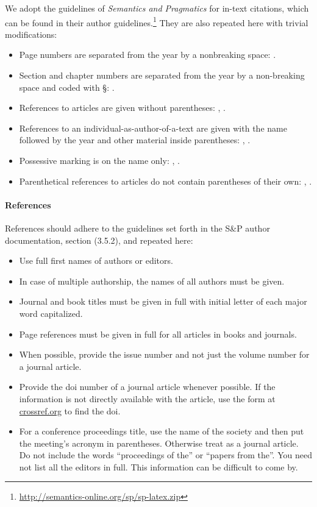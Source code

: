 \documentclass{salt}
\begin{document}
We adopt the guidelines of \emph{Semantics and Pragmatics} for in-text citations, which can be found in their author guidelines.\footnote{\url{http://semantics-online.org/sp/sp-latex.zip}}  They are also repeated here with trivial modifications:
\begin{itemize}
\item Page numbers are separated from the year by a nonbreaking space: .
\item Section and chapter numbers are separated from the year by a   non-breaking space and coded with \S: .
\item References to articles are given without parentheses: \citealt{Lewis-1973-counterfactuals}, .
\item References to an individual-as-author-of-a-text are given with the name followed by the year and other material inside parentheses: \citet{Lewis-1973-counterfactuals}, .
\item Possessive marking is on the name only: , .
\item Parenthetical references to articles do not contain parentheses of their own:  \citep{p2011}, .
\end{itemize}


\paragraph{References}

References should adhere to the guidelines set forth in the S\&P author documentation, section (3.5.2), and repeated here: 

\begin{itemize}
\item Use full first names of authors or editors.
\item In case of multiple authorship, the names of all authors must be given.
\item Journal and book titles must be given in full with initial letter of each major word capitalized.
\item Page references must be given in full for all articles in books and journals.
\item When possible, provide the issue number and not just the volume number for a journal article.
\item Provide the doi number of a journal article whenever possible.  If the information is not directly available with the article, use the form at \href{http://crossref.org}{crossref.org} to find the doi.
\item For a conference proceedings title, use the name of the society and then put the meeting's acronym in parentheses.  Otherwise treat as a journal article. Do not include the words ``proceedings of the'' or ``papers from the''.  You need not list all the editors in full. This information can be difficult to come by.
\end{itemize}
\end{document}
